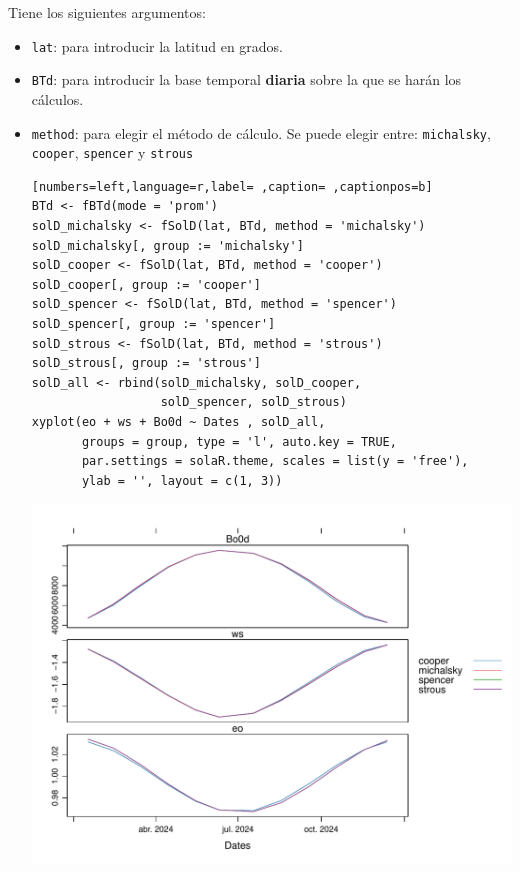Tiene los siguientes argumentos:
\begin{itemize}
\item \texttt{lat}: para introducir la latitud en grados.
\item \texttt{BTd}: para introducir la base temporal \textbf{diaria} sobre la que se harán los cálculos.
\item \texttt{method}: para elegir el método de cálculo. Se puede elegir entre: \texttt{michalsky}, \texttt{cooper}, \texttt{spencer} y \texttt{strous}
\begin{lstlisting}[numbers=left,language=r,label= ,caption= ,captionpos=b]
BTd <- fBTd(mode = 'prom')
solD_michalsky <- fSolD(lat, BTd, method = 'michalsky')
solD_michalsky[, group := 'michalsky']
solD_cooper <- fSolD(lat, BTd, method = 'cooper')
solD_cooper[, group := 'cooper']
solD_spencer <- fSolD(lat, BTd, method = 'spencer')
solD_spencer[, group := 'spencer']
solD_strous <- fSolD(lat, BTd, method = 'strous')
solD_strous[, group := 'strous']
solD_all <- rbind(solD_michalsky, solD_cooper,
                  solD_spencer, solD_strous)
xyplot(eo + ws + Bo0d ~ Dates , solD_all,
       groups = group, type = 'l', auto.key = TRUE,
       par.settings = solaR.theme, scales = list(y = 'free'),
       ylab = '', layout = c(1, 3))
\end{lstlisting}

\begin{center}
\includegraphics[width=\textwidth]{figuras/codigo-fSolD.pdf}
\end{center}
\end{itemize}
